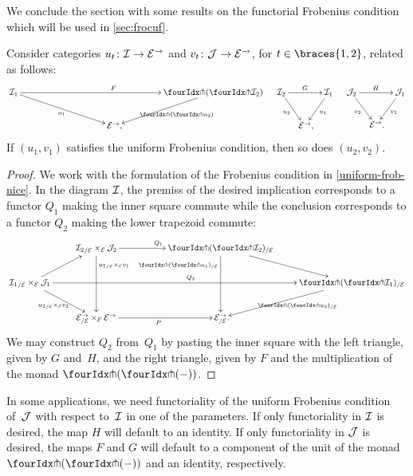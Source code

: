 \documentclass[reqno,10pt,a4paper,oneside,draft]{amsart}
\begin{document}
{{We conclude the section with some results on the functorial Frobenius condition which will be used in \cref{sec:frocuf}.

\begin{proposition} \label{uniform-frobenius-functorial}
Consider categories $u_t \co \cal{I} \to \cal{E}^\to$ and $v_t \co \cal{J} \to \cal{E}^\to$, for $t \in \braces{1, 2}$, related as follows:
\begin{align*}
\xymatrix@!C@C-3em{
  \cal{I}_1
  \ar[rr]^{F}
  \ar[dr]_{u_1}
&&
  \liftl{(\liftr{\cal{I}_2})}
  \ar[dl]^{\liftl{(\liftr{u_2})}}
\\&
  \catE^\to
\rlap{,}}
&&
\xymatrix@C-1.5em{
  \cal{I}_2
  \ar[rr]^-{G}
  \ar[dr]_{u_2}
&&
  \cal{I}_1
  \ar[dl]^{u_1}
\\&
  \catE^\to
\rlap{,}}
&&
\xymatrix@C-1.5em{
  \cal{J}_2
  \ar[rr]^-{H}
  \ar[dr]_{v_2}
&&
  \cal{J}_1
  \ar[dl]^{v_1}
\\&
  \catE^\to
\rlap{.}}
\end{align*}
If $(u_1, v_1)$ satisfies the uniform Frobenius condition, then so does $(u_2, v_2)$.
\end{proposition}

\begin{proof}
We work with the formulation of the Frobenius condition in \cref{uniform-frob-nice}.
In the diagram $\cal{I}$, the premiss of the desired implication corresponds to a functor $Q_1$ making the inner square commute while the conclusion corresponds to a functor $Q_2$ making the lower trapezoid commute:
\[
\xymatrix{
&
  {\cal{I}_2}_{/\cal{E}} \times_{\cal{E}} \cal{J}_2
  \ar[rr]^{Q_1}
  \ar[dd]^(0.25){{u_1}_{/\cal{E}} \times_{\cal{E}} v_1}
&&
  \liftl{(\liftr{\cal{I}_2})}_{/\cal{E}}
  \ar[dr]
  \ar[dd]_(0.25){\liftl{(\liftr{u_1})}_{/\cal{E}}}
\\
  {\cal{I}_1}_{/\cal{E}} \times_{\cal{E}} \cal{J}_1
  \ar[ur]
  \ar[dr]_{{u_2}_{/\cal{E}} \times_{\cal{E}} v_2}
  \ar[rrrr]^{Q_2}
&&&&
  \liftl{(\liftr{\cal{I}_1})}_{/\cal{E}}
  \ar[dl]^{\liftl{(\liftr{u_2})}_{/\cal{E}}}
\\&
  \cal{E}^\to_{/\cal{E}} \times_{\cal{E}} \cal{E}^\to
  \ar[rr]_{P}
&&
  \cal{E}^\to_{/\cal{E}}
\rlap{.}}
\]
We may construct $Q_2$ from~$Q_1$ by pasting the inner square with the left triangle, given by $G$ and~$H$, and the right triangle, given by $F$ and the multiplication of the monad $\liftl{(\liftr{(-)})}$.
\end{proof}


\begin{remark}
In some applications, we need functoriality of the uniform Frobenius condition of~$\cal{J}$ with respect to~$\cal{I}$ in one of the parameters.
If only functoriality in $\cal{I}$ is desired, the map $H$ will default to an identity.
If only functoriality in $\cal{J}$ is desired, the maps $F$ and $G$ will default to a component of the unit of the monad $\liftl{(\liftr{(-)})}$ and an identity, respectively.
\end{remark}

}}
\end{document}
